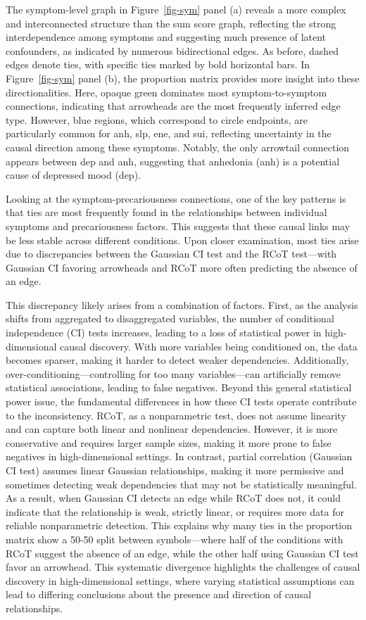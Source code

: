 \documentclass[
]{article}
\begin{document}
The symptom-level graph in Figure~\ref{fig-sym} panel (a) reveals a more
complex and interconnected structure than the sum score graph,
reflecting the strong interdependence among symptoms and suggesting much
presence of latent confounders, as indicated by numerous bidirectional
edges. As before, dashed edges denote ties, with specific ties marked by
bold horizontal bars. In Figure~\ref{fig-sym} panel (b), the proportion
matrix provides more insight into these directionalities. Here, opaque
green dominates most symptom-to-symptom connections, indicating that
arrowheads are the most frequently inferred edge type. However, blue
regions, which correspond to circle endpoints, are particularly common
for anh, slp, ene, and sui, reflecting uncertainty in the causal
direction among these symptoms. Notably, the only arrowtail connection
appears between dep and anh, suggesting that anhedonia (anh) is a
potential cause of depressed mood (dep).

Looking at the symptom-precariousness connections, one of the key
patterns is that ties are most frequently found in the relationships
between individual symptoms and precariousness factors. This suggests
that these causal links may be less stable across different conditions.
Upon closer examination, most ties arise due to discrepancies between
the Gaussian CI test and the RCoT test---with Gaussian CI favoring
arrowheads and RCoT more often predicting the absence of an edge.

This discrepancy likely arises from a combination of factors. First, as
the analysis shifts from aggregated to disaggregated variables, the
number of conditional independence (CI) tests increases, leading to a
loss of statistical power in high-dimensional causal discovery. With
more variables being conditioned on, the data becomes sparser, making it
harder to detect weaker dependencies. Additionally,
over-conditioning---controlling for too many variables---can
artificially remove statistical associations, leading to false
negatives. Beyond this general statistical power issue, the fundamental
differences in how these CI tests operate contribute to the
inconsistency. RCoT, as a nonparametric test, does not assume linearity
and can capture both linear and nonlinear dependencies. However, it is
more conservative and requires larger sample sizes, making it more prone
to false negatives in high-dimensional settings. In contrast, partial
correlation (Gaussian CI test) assumes linear Gaussian relationships,
making it more permissive and sometimes detecting weak dependencies that
may not be statistically meaningful. As a result, when Gaussian CI
detects an edge while RCoT does not, it could indicate that the
relationship is weak, strictly linear, or requires more data for
reliable nonparametric detection. This explains why many ties in the
proportion matrix show a 50-50 split between symbols---where half of the
conditions with RCoT suggest the absence of an edge, while the other
half using Gaussian CI test favor an arrowhead. This systematic
divergence highlights the challenges of causal discovery in
high-dimensional settings, where varying statistical assumptions can
lead to differing conclusions about the presence and direction of causal
relationships.
\end{document}
